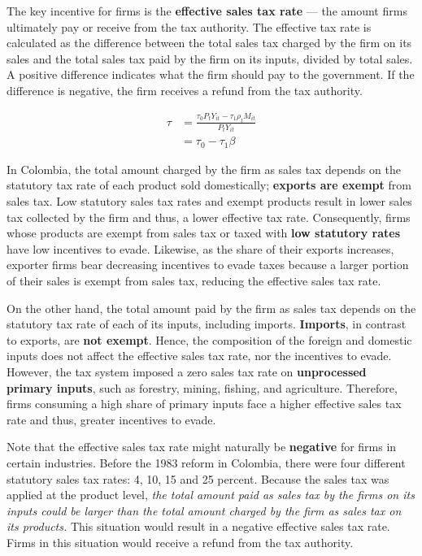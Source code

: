 \documentclass[
  12pt]{article}
\theoremstyle{definition}
\theoremstyle{remark}
\begin{document}
The key incentive for firms is the \textbf{effective sales tax rate} ---
the amount firms ultimately pay or receive from the tax authority. The
effective tax rate is calculated as the difference between the total
sales tax charged by the firm on its sales and the total sales tax paid
by the firm on its inputs, divided by total sales. A positive difference
indicates what the firm should pay to the government. If the difference
is negative, the firm receives a refund from the tax authority.

\[
\begin{aligned}
\tau &= \frac{\tau_0P_tY_{it} - \tau_1\rho_t M_{it}}{P_tY_{it}} \\
&= \tau_0 - \tau_1 \beta
\end{aligned}
\]

In Colombia, the total amount charged by the firm as sales tax depends
on the statutory tax rate of each product sold domestically;
\textbf{exports are exempt} from sales tax. Low statutory sales tax
rates and exempt products result in lower sales tax collected by the
firm and thus, a lower effective tax rate. Consequently, firms whose
products are exempt from sales tax or taxed with \textbf{low statutory
rates} have low incentives to evade. Likewise, as the share of their
exports increases, exporter firms bear decreasing incentives to evade
taxes because a larger portion of their sales is exempt from sales tax,
reducing the effective sales tax rate.

On the other hand, the total amount paid by the firm as sales tax
depends on the statutory tax rate of each of its inputs, including
imports. \textbf{Imports}, in contrast to exports, are \textbf{not
exempt}. Hence, the composition of the foreign and domestic inputs does
not affect the effective sales tax rate, nor the incentives to evade.
However, the tax system imposed a zero sales tax rate on
\textbf{unprocessed primary inputs}, such as forestry, mining, fishing,
and agriculture. Therefore, firms consuming a high share of primary
inputs face a higher effective sales tax rate and thus, greater
incentives to evade.

Note that the effective sales tax rate might naturally be
\textbf{negative} for firms in certain industries. Before the 1983
reform in Colombia, there were four different statutory sales tax rates:
4, 10, 15 and 25 percent. Because the sales tax was applied at the
product level, \emph{the total amount paid as sales tax by the firms on
its inputs could be larger than the total amount charged by the firm as
sales tax on its products.} This situation would result in a negative
effective sales tax rate. Firms in this situation would receive a refund
from the tax authority.
\end{document}
